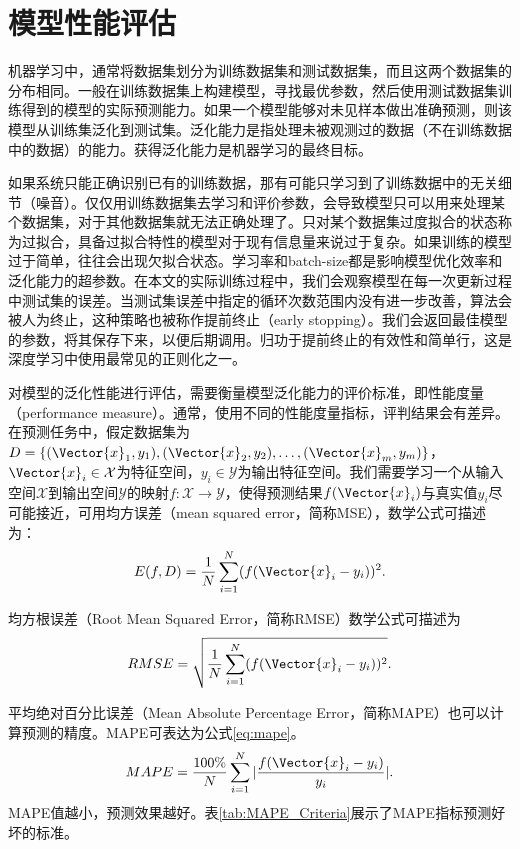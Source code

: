 \section{模型性能评估}


机器学习中，通常将数据集划分为训练数据集和测试数据集，而且这两个数据集的分布相同。一般在训练数据集上构建模型，寻找最优参数，然后使用测试数据集训练得到的模型的实际预测能力。如果一个模型能够对未见样本做出准确预测，则该模型从训练集泛化到测试集。泛化能力是指处理未被观测过的数据（不在训练数据中的数据）的能力。获得泛化能力是机器学习的最终目标。

如果系统只能正确识别已有的训练数据，那有可能只学习到了训练数据中的无关细节（噪音）。仅仅用训练数据集去学习和评价参数，会导致模型只可以用来处理某个数据集，对于其他数据集就无法正确处理了。只对某个数据集过度拟合的状态称为过拟合，具备过拟合特性的模型对于现有信息量来说过于复杂。如果训练的模型过于简单，往往会出现欠拟合状态。学习率和batch-size都是影响模型优化效率和泛化能力的超参数。在本文的实际训练过程中，我们会观察模型在每一次更新过程中测试集的误差。当测试集误差中指定的循环次数范围内没有进一步改善，算法会被人为终止，这种策略也被称作提前终止（early stopping）。我们会返回最佳模型的参数，将其保存下来，以便后期调用。归功于提前终止的有效性和简单行，这是深度学习中使用最常见的正则化之一。

对模型的泛化性能进行评估，需要衡量模型泛化能力的评价标准，即性能度量（performance measure）。通常，使用不同的性能度量指标，评判结果会有差异。在预测任务中，假定数据集为$D=\{(\Vector{x}_1,y_1),(\Vector{x}_2,y_2),\ldots,(\Vector{x}_m,y_m)\}$，$\Vector{x}_i\in\mathcal{X}$为特征空间，$y_i\in\mathcal{Y}$为输出特征空间。我们需要学习一个从输入空间$\mathcal{X}$到输出空间$\mathcal{Y}$的映射$f:\mathcal{X}\rightarrow\mathcal{Y}$，使得预测结果$f(\Vector{x}_i)$与真实值$y_i$尽可能接近，可用均方误差（mean squared error，简称MSE），数学公式可描述为：
\begin{equation}
    E(f,D)=\frac{1}{N}\sum_{i=1}^{N}(f(\Vector{x}_i-y_i))^2.
\end{equation}

均方根误差（Root Mean Squared Error，简称RMSE）数学公式可描述为
\begin{equation}
    RMSE=\sqrt{\frac{1}{N}\sum_{i=1}^{N}(f(\Vector{x}_i-y_i))^2}.
\end{equation}

平均绝对百分比误差（Mean Absolute Percentage Error，简称MAPE）也可以计算预测的精度。MAPE可表达为公式\ref{eq:mape}。
\begin{equation} \label{eq:mape}
    MAPE=\frac{100\%}{N}\sum_{i=1}^{N}|\frac{f(\Vector{x}_i-y_i)}{y_i}|.
\end{equation}
MAPE值越小，预测效果越好。表\ref{tab:MAPE_Criteria}展示了MAPE指标预测好坏的标准。

